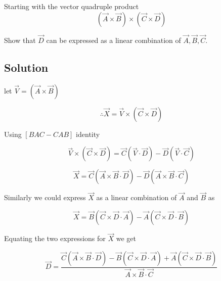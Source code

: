 \documentclass[12pt]{article}
\begin{document}
Starting with the vector quadruple product
\[
    (\vec{A} \times \vec{B}) \times(\vec{C} \times \vec{D})
\]

Show that \(\vec{D}\) can be expressed as a linear combination of \(\vec{A}, \vec{B}, \vec{C}\).

\subsection{Solution}

let \(
\vec{V} = (\vec{A} \times \vec{B})
\)

\[
    \therefore \vec{X} = \vec{V} \times (\vec{C} \times \vec{D})
\]

Using \([BAC - CAB]\) identity

\[
    \vec{V} \times (\vec{C} \times \vec{D})
    = \vec{C}(\vec{V} \cdot \vec{D}) - \vec{D}(\vec{V} \cdot \vec{C})
\]

\[
    \vec{X}
    = \vec{C}(\vec{A} \times \vec{B} \cdot \vec{D})
    - \vec{D}(\vec{A} \times \vec{B} \cdot \vec{C})
\]

Similarly we could express \(\vec{X}\) as a linear combination of \(\vec{A}\) and \(\vec{B}\) as

\[
    \vec{X}
    = \vec{B}(\vec{C} \times \vec{D} \cdot \vec{A})
    - \vec{A}(\vec{C} \times \vec{D} \cdot \vec{B})
\]

Equating the two expressions for \(\vec{X}\) we get

\[
    \vec{D}
    = \frac{\vec{C}(\vec{A} \times \vec{B} \cdot \vec{D})
    - \vec{B}(\vec{C} \times \vec{D} \cdot \vec{A})
    + \vec{A}(\vec{C} \times \vec{D} \cdot \vec{B})}
    {\vec{A} \times \vec{B} \cdot \vec{C}}
\]

\newpage


\nocite{El-Deeb_PEU-218_Assignments}
\end{document}

